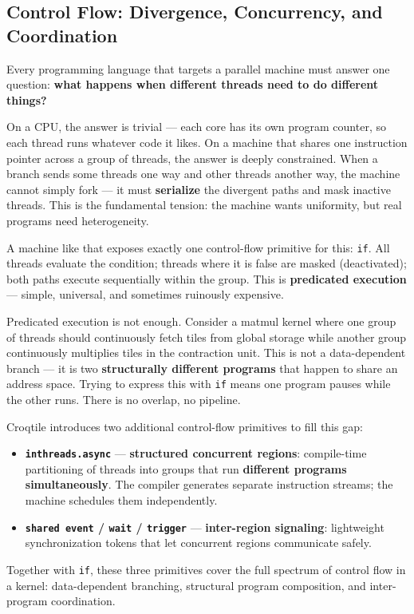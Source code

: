 \subsection*{Control Flow: Divergence, Concurrency, and Coordination}

Every programming language that targets a parallel machine must answer one question: \textbf{what happens when different threads need to do different things?}

On a CPU, the answer is trivial --- each core has its own program counter, so each thread runs whatever code it likes. On a machine that shares one instruction pointer across a group of threads, the answer is deeply constrained. When a branch sends some threads one way and other threads another way, the machine cannot simply fork --- it must \textbf{serialize} the divergent paths and mask inactive threads. This is the fundamental tension: the machine wants uniformity, but real programs need heterogeneity.

A machine like that exposes exactly one control-flow primitive for this: \texttt{if}. All threads evaluate the condition; threads where it is false are masked (deactivated); both paths execute sequentially within the group. This is \textbf{predicated execution} --- simple, universal, and sometimes ruinously expensive.

Predicated execution is not enough. Consider a matmul kernel where one group of threads should continuously fetch tiles from global storage while another group continuously multiplies tiles in the contraction unit. This is not a data-dependent branch --- it is two \textbf{structurally different programs} that happen to share an address space. Trying to express this with \texttt{if} means one program pauses while the other runs. There is no overlap, no pipeline.

Croqtile introduces two additional control-flow primitives to fill this gap:

\begin{itemize}[leftmargin=1.6em]
\item \textbf{\texttt{inthreads.\allowbreak{}async}} --- \textbf{structured concurrent regions}: compile-time partitioning of threads into groups that run \textbf{different programs simultaneously}. The compiler generates separate instruction streams; the machine schedules them independently.
\item \textbf{\texttt{shared event} / \texttt{wait} / \texttt{trigger}} --- \textbf{inter-region signaling}: lightweight synchronization tokens that let concurrent regions communicate safely.
\end{itemize}

Together with \texttt{if}, these three primitives cover the full spectrum of control flow in a kernel: data-dependent branching, structural program composition, and inter-program coordination.
